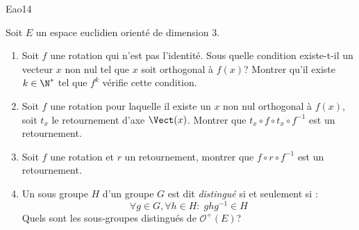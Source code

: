 \begin{tiny}Eao14\end{tiny} Soit $E$ un espace euclidien orienté de dimension $3$.
\begin{enumerate}
 \item Soit $f$ une rotation qui n'est pas l'identité. Sous quelle condition existe-t-il un vecteur $x$ non nul tel que $x$ soit orthogonal à $f(x)$? Montrer qu'il existe $k \in \N^*$ tel que $f^{k}$ vérifie cette condition.
 \item Soit $f$ une rotation pour laquelle il existe un $x$ non nul orthogonal à $f(x)$, soit $t_x$ le retournement d'axe $\Vect(x)$. Montrer que $t_x\circ f \circ t_x \circ f^{-1}$ est un retournement.
 \item Soit $f$ une rotation et $r$ un retournement, montrer que $f\circ r \circ f^{-1}$ est un retournement.
 \item Un sous groupe $H$ d'un groupe $G$ est dit \emph{distingué} si et seulement si :
\begin{displaymath}
 \forall g\in G, \forall h\in H :\;ghg^{-1}\in H
\end{displaymath}
Quels sont les sous-groupes distingués de $\mathcal{O}^+(E)$?
\end{enumerate}
 